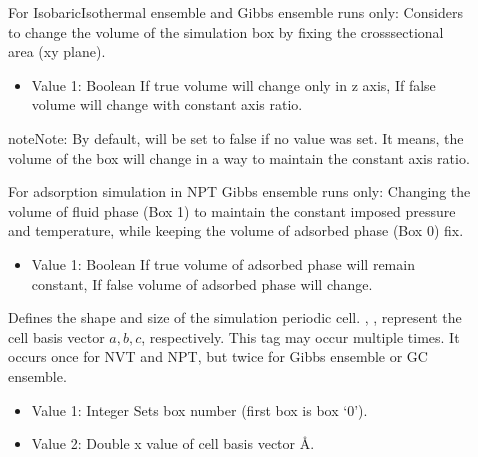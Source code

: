 \documentclass[letterpaper,10pt,english]{sphinxmanual}
\begin{document}
\begin{description}
\item[{}] \leavevmode
For Isobaric\sphinxhyphen{}Isothermal ensemble and Gibbs ensemble runs only: Considers to change the volume of the simulation box by fixing the cross\sphinxhyphen{}sectional area (x\sphinxhyphen{}y plane).
\begin{itemize}
\item {} 
Value 1: Boolean \sphinxhyphen{} If true volume will change only in z axis, If false volume will change with constant axis ratio.

\end{itemize}

\begin{sphinxadmonition}{note}{Note:}
By default,  will be set to false if no value was set. It means, the volume of the box will change in a way to maintain the constant axis ratio.
\end{sphinxadmonition}

\item[{}] \leavevmode
For adsorption simulation in NPT Gibbs ensemble runs only: Changing the volume of fluid phase (Box 1) to maintain the constant imposed pressure and temperature, while keeping the volume of adsorbed phase (Box 0) fix.
\begin{itemize}
\item {} 
Value 1: Boolean \sphinxhyphen{} If true volume of adsorbed phase will remain constant, If false volume of adsorbed phase will change.

\end{itemize}

\item[{}] \leavevmode
Defines the shape and size of the simulation periodic cell. , ,  represent the cell basis vector \(a,b,c\), respectively. This tag may occur multiple times. It occurs once for NVT and NPT, but twice for Gibbs ensemble or GC ensemble.
\begin{itemize}
\item {} 
Value 1: Integer \sphinxhyphen{} Sets box number (first box is box ‘0’).

\item {} 
Value 2: Double \sphinxhyphen{} x value of cell basis vector \(Å\).


\end{itemize}
\end{description}
\end{document}
